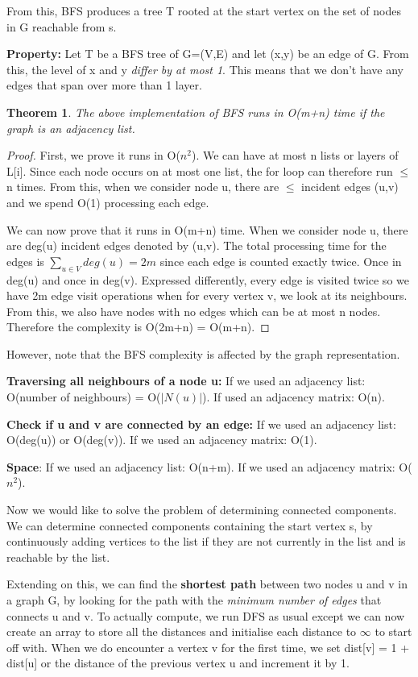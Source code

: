 \documentclass[11pt, oneside]{article}
\newtheorem{theorem}{Theorem}
\theoremstyle{definition}
\begin{document}
From this, BFS produces a tree T rooted at the start vertex on the set of nodes in G reachable from s.

\textbf{Property:} Let T be a BFS tree of G=(V,E) and let (x,y) be an edge of G. From this, the level of x and y \textit{differ by at most 1}. This means that we don't have any edges that span over more than 1 layer.

\begin{theorem}
  The above implementation of BFS runs in O(m+n) time if the graph is an adjacency list.
\end{theorem}
\begin{proof}
  First, we prove it runs in O($n^2$). We can have at most n lists or layers of L[i]. Since each node occurs on at most one list, the for loop can therefore run $\leq$ n times. From this, when we consider node u, there are $\leq$ incident edges (u,v) and we spend O(1) processing each edge.

  We can now prove that it runs in O(m+n) time. When we consider node u, there are deg(u) incident edges denoted by (u,v). The total processing time for the edges is $\sum\limits_{u \in V}deg(u) = 2m$ since each edge is counted exactly twice. Once in deg(u) and once in deg(v). Expressed differently, every edge is visited twice so we have 2m edge visit operations when for every vertex v, we look at its neighbours. From this, we also have nodes with no edges which can be at most n nodes. Therefore the complexity is O(2m+n) = O(m+n).
\end{proof}

However, note that the BFS complexity is affected by the graph representation.

\textbf{Traversing all neighbours of a node u:} If we used an adjacency list: O(number of neighbours) = O($|N(u)|$). If used an adjacency matrix: O(n).

\textbf{Check if u and v are connected by an edge:} If we used an adjacency list: O(deg(u)) or O(deg(v)). If we used an adjacency matrix: O(1).

\textbf{Space}: If we used an adjacency list: O(n+m). If we used an adjacency matrix: O($n^2$).

Now we would like to solve the problem of determining connected components. We can determine connected components containing the start vertex s, by continuously adding vertices to the list if they are not currently in the list and is reachable by the list.

Extending on this, we can find the \textbf{shortest path} between two nodes u and v in a graph G, by looking for the path with the \textit{minimum number of edges} that connects u and v. To actually compute, we run DFS as usual except we can now create an array to store all the distances and initialise each distance to $\infty$ to start off with. When we do encounter a vertex v for the first time, we set dist[v] = 1 + dist[u] or the distance of the previous vertex u and increment it by 1.
\end{document}
